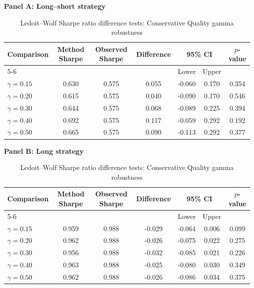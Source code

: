 \begin{table}[H]
\centering
\footnotesize
\renewcommand{\arraystretch}{1.12}
\setlength{\tabcolsep}{4pt}
\caption{Ledoit--Wolf Sharpe ratio difference tests: Conservative Quality gamma robustness}
\label{tab:conservative_gamma_sharpe_difference_tests_ledoit_wolf}
\begin{threeparttable}
{\centering\textbf{Panel A: Long--short strategy}\par}
\vspace{0.4em}
\begin{tabular*}{\textwidth}{@{\extracolsep{\fill}}lcccccc}
\toprule
Comparison & Method Sharpe & Observed Sharpe & Difference & \multicolumn{2}{c}{95\% CI} & $p$-value \\
\cmidrule(lr){5-6}
& & & & Lower & Upper & \\
\midrule
$\gamma=0.15$ & 0.630 & 0.575 & 0.055 & -0.060 & 0.170 & 0.354 \\
$\gamma=0.20$ & 0.615 & 0.575 & 0.040 & -0.090 & 0.170 & 0.546 \\
$\gamma=0.30$ & 0.644 & 0.575 & 0.068 & -0.089 & 0.225 & 0.394 \\
$\gamma=0.40$ & 0.692 & 0.575 & 0.117 & -0.059 & 0.292 & 0.192 \\
$\gamma=0.50$ & 0.665 & 0.575 & 0.090 & -0.113 & 0.292 & 0.377 \\
\bottomrule
\end{tabular*}
\vspace{1em}
{\centering\textbf{Panel B: Long strategy}\par}
\vspace{0.4em}
\begin{tabular*}{\textwidth}{@{\extracolsep{\fill}}lcccccc}
\toprule
Comparison & Method Sharpe & Observed Sharpe & Difference & \multicolumn{2}{c}{95\% CI} & $p$-value \\
\cmidrule(lr){5-6}
& & & & Lower & Upper & \\
\midrule
$\gamma=0.15$ & 0.959 & 0.988 & -0.029 & -0.064 & 0.006 & 0.099 \\
$\gamma=0.20$ & 0.962 & 0.988 & -0.026 & -0.075 & 0.022 & 0.275 \\
$\gamma=0.30$ & 0.956 & 0.988 & -0.032 & -0.085 & 0.021 & 0.226 \\
$\gamma=0.40$ & 0.963 & 0.988 & -0.025 & -0.080 & 0.030 & 0.349 \\
$\gamma=0.50$ & 0.962 & 0.988 & -0.026 & -0.086 & 0.034 & 0.375 \\
\bottomrule
\end{tabular*}

\end{threeparttable}
\end{table}
